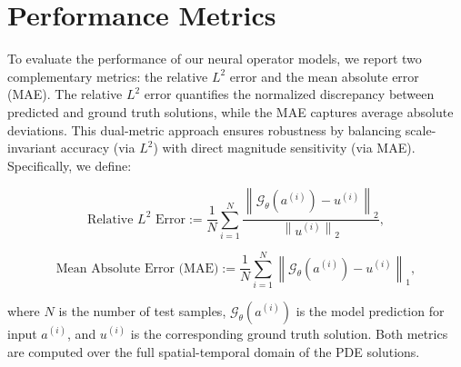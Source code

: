 \section{Performance Metrics}

To evaluate the performance of our neural operator models, we report two complementary metrics: the relative \( L^2 \) error and the mean absolute error (MAE). The relative \( L^2 \) error quantifies the normalized discrepancy between predicted and ground truth solutions, while the MAE captures average absolute deviations. This dual-metric approach ensures robustness by balancing scale-invariant accuracy (via \( L^2 \)) with direct magnitude sensitivity (via MAE). Specifically, we define:

\begin{equation}
\text{Relative } L^2 \text{ Error} := \frac{1}{N} \sum_{i=1}^{N} 
\frac{\left\| \mathcal{G}_\theta(a^{(i)}) - u^{(i)} \right\|_2}{\left\| u^{(i)} \right\|_2},
\end{equation}

\begin{equation}
\text{Mean Absolute Error (MAE)} := \frac{1}{N} \sum_{i=1}^{N} 
\left\| \mathcal{G}_\theta(a^{(i)}) - u^{(i)} \right\|_1,
\end{equation}

where \( N \) is the number of test samples, \( \mathcal{G}_\theta(a^{(i)}) \) is the model prediction for input \( a^{(i)} \), and \( u^{(i)} \) is the corresponding ground truth solution. Both metrics are computed over the full spatial-temporal domain of the PDE solutions.



